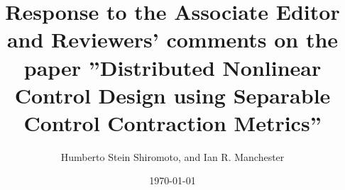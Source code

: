 \documentclass[11pt,a4]{article}
\begin{document}
\title{Response to the Associate Editor and Reviewers' comments on the 
paper ''Distributed Nonlinear Control Design using Separable Control 
Contraction Metrics''}

\author{Humberto Stein Shiromoto, and Ian R. Manchester}

\date{\today}
                                                
\maketitle


\printbibliography
\end{document}
